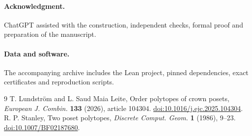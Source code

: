 \documentclass[11pt]{article}
\begin{document}
\paragraph{Acknowledgment.}
ChatGPT assisted with the construction, independent checks,
formal proof and preparation of the manuscript.

\paragraph{Data and software.} The accompanying archive includes the Lean project, pinned dependencies, exact certificates and reproduction scripts.\par
\begin{thebibliography}{9}
 T. Lundstr\"om and L. Saud Maia Leite,
Order polytopes of crown posets, \emph{European J. Combin.}
\textbf{133} (2026), article 104304.
\href{https://doi.org/10.1016/j.ejc.2025.104304}{doi:10.1016/j.ejc.2025.104304}.
 R. P. Stanley, Two poset polytopes,
\emph{Discrete Comput. Geom.} \textbf{1} (1986), 9--23.
\href{https://doi.org/10.1007/BF02187680}{doi:10.1007/BF02187680}.
\end{thebibliography}
\end{document}
